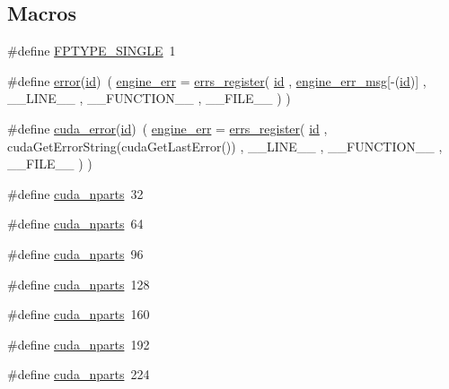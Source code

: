 \subsection*{Macros}
\begin{DoxyCompactItemize}
\item 
\#define \hyperlink{runner__cuda_8cu_ac6e14cd493e803bd2fca28d5c99fdeff}{F\-P\-T\-Y\-P\-E\-\_\-\-S\-I\-N\-G\-L\-E}~1
\item 
\#define \hyperlink{runner__cuda_8cu_a7673862d447029edaf3172ebd94aa28e}{error}(\hyperlink{errs_8c_a7441ef0865bcb3db9b8064dd7375c1ea}{id})~( \hyperlink{engine_8h_a3724bd1c34d31c4ff37eaff52dc0a580}{engine\-\_\-err} = \hyperlink{errs_8h_ae37a9c0e0a0aa4a92dbe64c0f38ed95c}{errs\-\_\-register}( \hyperlink{errs_8c_a7441ef0865bcb3db9b8064dd7375c1ea}{id} , \hyperlink{engine_8h_aa489083c5e5d436bafd05a7860b21804}{engine\-\_\-err\-\_\-msg}\mbox{[}-\/(\hyperlink{errs_8c_a7441ef0865bcb3db9b8064dd7375c1ea}{id})\mbox{]} , \-\_\-\-\_\-\-L\-I\-N\-E\-\_\-\-\_\- , \-\_\-\-\_\-\-F\-U\-N\-C\-T\-I\-O\-N\-\_\-\-\_\- , \-\_\-\-\_\-\-F\-I\-L\-E\-\_\-\-\_\- ) )
\item 
\#define \hyperlink{runner__cuda_8cu_a0295c5fc38a1d1e9a381a97ba0adb616}{cuda\-\_\-error}(\hyperlink{errs_8c_a7441ef0865bcb3db9b8064dd7375c1ea}{id})~( \hyperlink{engine_8h_a3724bd1c34d31c4ff37eaff52dc0a580}{engine\-\_\-err} = \hyperlink{errs_8h_ae37a9c0e0a0aa4a92dbe64c0f38ed95c}{errs\-\_\-register}( \hyperlink{errs_8c_a7441ef0865bcb3db9b8064dd7375c1ea}{id} , cuda\-Get\-Error\-String(cuda\-Get\-Last\-Error()) , \-\_\-\-\_\-\-L\-I\-N\-E\-\_\-\-\_\- , \-\_\-\-\_\-\-F\-U\-N\-C\-T\-I\-O\-N\-\_\-\-\_\- , \-\_\-\-\_\-\-F\-I\-L\-E\-\_\-\-\_\- ) )
\item 
\#define \hyperlink{runner__cuda_8cu_a73a9582f0db5b61423deb6c2e5ade9e8}{cuda\-\_\-nparts}~32
\item 
\#define \hyperlink{runner__cuda_8cu_a73a9582f0db5b61423deb6c2e5ade9e8}{cuda\-\_\-nparts}~64
\item 
\#define \hyperlink{runner__cuda_8cu_a73a9582f0db5b61423deb6c2e5ade9e8}{cuda\-\_\-nparts}~96
\item 
\#define \hyperlink{runner__cuda_8cu_a73a9582f0db5b61423deb6c2e5ade9e8}{cuda\-\_\-nparts}~128
\item 
\#define \hyperlink{runner__cuda_8cu_a73a9582f0db5b61423deb6c2e5ade9e8}{cuda\-\_\-nparts}~160
\item 
\#define \hyperlink{runner__cuda_8cu_a73a9582f0db5b61423deb6c2e5ade9e8}{cuda\-\_\-nparts}~192
\item 
\#define \hyperlink{runner__cuda_8cu_a73a9582f0db5b61423deb6c2e5ade9e8}{cuda\-\_\-nparts}~224

\end{DoxyCompactItemize}
